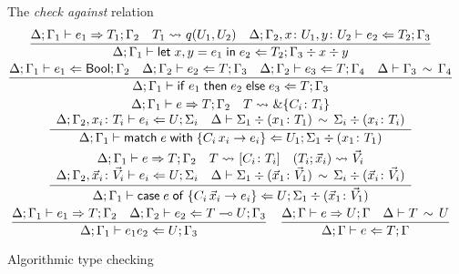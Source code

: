 \begin{figure}[t]
  The \emph{check against} relation\hfill{}
  \begin{gather*}
    \frac{
      \algtypeout[\kindEnv ; \varEnv_1]{e_1}{T_1}{\varEnv_2}
      \quad
      T_1 \Extract{} q(U_1, U_2)
      \quad
      \algtypein[\kindEnv; \varEnv_2, x\colon U_1, y\colon U_2]{e_2}{T_2}{\varEnv_3}
    }{
      \algtypein[\kindEnv;
      \varEnv_1]{\binlete{x}{y}{e_1}{e_2}}{T_2}{\varEnv_3} \div x \div y
    }
    \\
    \frac{
      \algtypein[\kindEnv;\varEnv_1]{e_1}{\boole}{\varEnv_2}
      \quad
      \algtypein[\kindEnv;\varEnv_2]{e_2}{T}{\varEnv_3}
      \quad
      \algtypein[\kindEnv;\varEnv_2]{e_3}{T}{\varEnv_4}
      \quad
      \ctxequiv{\varEnv_3}{\varEnv_4}
    }{
      \algtypein[\kindEnv;\varEnv_1]{\conditionale{e_1}{e_2}{e_3}}{T}{\varEnv_3}
    }
    \\
    \frac{
      \begin{array}{c}
        \algtypeout[\kindEnv;\varEnv_1]{e}{T}{\varEnv_2}
        \quad
        T \Extract{} \&\{C_i\colon T_i\}
        \\
        \algtypein[\kindEnv;\varEnv_2, x_i\colon T_i]{e_i}{U}{\Sigma_i}
        \quad
        \ctxequiv{\Sigma_1 \div (x_1\colon T_1)}{\Sigma_i \div (x_i\colon T_i)} 
      \end{array}
    }{
      \algtypein[\kindEnv;\varEnv_1]{\matche{e}{\{C_i\,x_i
          \rightarrow e_i\}}}{U_1}{\Sigma_1 \div (x_1\colon T_1)}
    }
    \\
    \frac{
      \begin{array}{c}
        \algtypeout[\kindEnv;\varEnv_1]{e}{T}{\varEnv_2}
        \quad
        T \Extract{}[C_i\colon T_i]
        \quad
        (T_i;\vec x_i) \Extract{}{\vec V_i}
        \\
        \algtypein[\kindEnv;\varEnv_2, \vec x_i\colon\vec V_i]{e_i}{U}{\Sigma_i}
        \quad
        \ctxequiv{\Sigma_1 \div (\vec x_1\colon\vec V_1)}{\Sigma_i \div (\vec x_i\colon\vec V_i)} 
      \end{array}
    }{
      \algtypein[\kindEnv;\varEnv_1]{\casee{e}{\{C_i\,\vec x_i\rightarrow e_i\}}}{U}{\Sigma_1 \div (\vec x_1\colon\vec V_1)}
    }
    \\
    \frac{
      \algtypeout[\kindEnv;\varEnv_1]{e_1}{T}{\varEnv_2}
      \quad
      \algtypein[\kindEnv;\varEnv_2]{e_2}{T\multimap U}{\varEnv_3}
    }{
      \algtypein[\kindEnv;\varEnv_1]{e_1e_2}{U}{\varEnv_3}
    }
    \quad
    \frac{
      \algtypeout e U \varEnv
      \quad
      \typeequiv T U
    }{
      \algtypein e T \varEnv
    }
  \end{gather*}
  \caption{Algorithmic type checking}
  \label{fig:alg-typing}
\end{figure}

